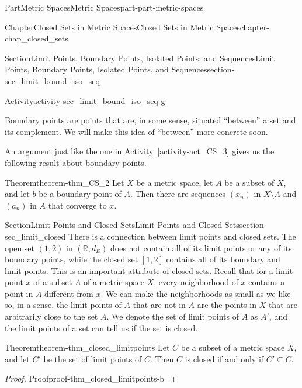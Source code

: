 \documentclass[oneside,10pt,]{book}
\newcommand{\xreffont}{\relax}
\numberwithin{equation}{chapter}
\newcommand{\R}{\mathbb{R}}
\begin{document}
\begin{partptx}{Part}{Metric Spaces}{}{Metric Spaces}{}{}{part-part-metric-spaces}
\begin{chapterptx}{Chapter}{Closed Sets in Metric Spaces}{}{Closed Sets in Metric Spaces}{}{}{chapter-chap_closed_sets}
\begin{sectionptx}{Section}{Limit Points, Boundary Points, Isolated Points, and Sequences}{}{Limit Points, Boundary Points, Isolated Points, and Sequences}{}{}{section-sec_limit_bound_iso_seq}
\begin{activity}{Activity}{}{activity-sec_limit_bound_iso_seq-g}
\begin{enumerate}[font=\bfseries,label=(\alph*),ref=\alph*]
\end{enumerate}%
\end{activity}%
Boundary points are points that are, in some sense, situated ``between'' a set and its complement. We will make this idea of ``between'' more concrete soon.%
\par
An argument just like the one in \hyperref[activity-act_CS_3]{Activity~{\xreffont\ref{activity-act_CS_3}}} gives us the following result about boundary points.%
\begin{theorem}{Theorem}{}{}{theorem-thm_CS_2}%
Let \(X\) be a metric space, let \(A\) be a subset of \(X\), and let \(b\) be a boundary point of \(A\). Then there are sequences \((x_n)\) in \(X \setminus A\) and \((a_n)\) in \(A\) that converge to \(x\).%
\end{theorem}
\end{sectionptx}
%
%
\typeout{************************************************}
\typeout{************************************************}
%
\begin{sectionptx}{Section}{Limit Points and Closed Sets}{}{Limit Points and Closed Sets}{}{}{section-sec_limit_closed}
There is a connection between limit points and closed sets. The open set \((1,2)\) in \((\R, d_E)\) does not contain all of its limit points or any of its boundary points, while the closed set \([1,2]\) contains all of its boundary and limit points. This is an important attribute of closed sets. Recall that for a limit point \(x\) of a subset \(A\) of a metric space \(X\), every neighborhood of \(x\) contains a point in \(A\) different from \(x\). We can make the neighborhoods as small as we like so, in a sense, the limit points of \(A\) that are not in \(A\) are the points in \(X\) that are arbitrarily close to the set \(A\). We denote the set of limit points of \(A\) as \(A'\), and the limit points of a set can tell us if the set is closed.%
\begin{theorem}{Theorem}{}{}{theorem-thm_closed_limitpoints}%
Let \(C\) be a subset of a metric space \(X\), and let \(C'\) be the set of limit points of \(C\). Then \(C\) is closed if and only if \(C' \subseteq C\).%
\end{theorem}
\begin{proof}{Proof}{}{proof-thm_closed_limitpoints-b}

\end{proof}
\end{sectionptx}
\end{chapterptx}
\end{partptx}
\end{document}
